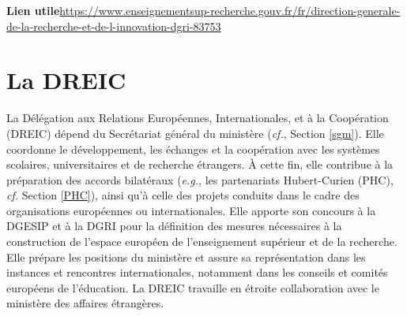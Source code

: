 
\textbf{Lien utile\hspace{0.5em}}\url{https://www.enseignementsup-recherche.gouv.fr/fr/direction-generale-de-la-recherche-et-de-l-innovation-dgri-83753}

\section{La DREIC}\label{DREIC}
La D\'el\'egation aux Relations Europ\'eennes, Internationales, et \`a la Coop\'eration (DREIC) d\'epend du Secr\'etariat g\'en\'eral du minist\`ere ({\em cf.}, Section \ref{sgm}). Elle coordonne le d\'eveloppement, les \'echanges et la coop\'eration avec les syst\`emes scolaires, universitaires et de recherche \'etrangers. \`A cette fin, elle contribue \`a la pr\'eparation des accords bilat\'eraux ({\em e.g.}, les partenariats Hubert-Curien (PHC), {\em cf.} Section \ref{PHC}), ainsi qu'\`a celle des projets conduits dans le cadre des organisations europ\'eennes ou internationales. Elle apporte son concours \`a la DGESIP et \`a la DGRI pour la d\'efinition des mesures n\'ecessaires \`a la construction de l'espace europ\'een de l'enseignement sup\'erieur et de la recherche. Elle pr\'epare les positions du minist\`ere et assure sa repr\'esentation dans les instances et rencontres internationales, notamment dans les conseils et comit\'es europ\'eens de l'\'education. La DREIC travaille en \'etroite collaboration avec le minist\`ere des affaires \'etrang\`eres.

